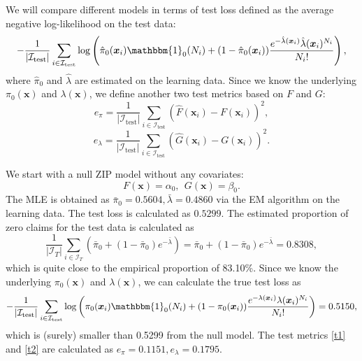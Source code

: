 \documentclass[11pt]{article}
\numberwithin{equation}{section}
\def\bx{\boldsymbol{x}}
\begin{document}
We will compare different models in terms of test loss defined as the average negative log-likelihood on the test data:
\begin{equation}\label{zip-test-loss}
	-\frac{1}{|\mathcal{I}_\text{test}|}\sum_{i\in\mathcal{I}_\text{test}}\log \left(\hat{\pi}_0(\bx_i)\mathbbm{1}_0(N_i) + 
	(1-\hat{\pi}_0(\bx_i))\frac{e^{-\hat{\lambda}(\bx_i)}\hat{\lambda}(\bx_i)^{N_i}}{N_i!}\right),
\end{equation} 
where $\hat{\pi}_0$ and $\hat{\lambda}$ are estimated on the learning data. 
Since we know the underlying $\pi_0(\bx)$ and $\lambda(\bx)$, we define another two test metrics based on $F$ and $G$:
\begin{equation}\label{t1}
	e_\pi=\frac{1}{|\mathcal{I}_\text{test}|}\sum_{i\in\mathcal{I}_\text{test}}(\hat{F}(\bx_i)-F(\bx_i))^2,
\end{equation}
\begin{equation}\label{t2}
	e_\lambda=\frac{1}{|\mathcal{I}_\text{test}|}\sum_{i\in\mathcal{I}_\text{test}}(\hat{G}(\bx_i)-G(\bx_i))^2.
\end{equation}


We start with a null ZIP model without any covariates:
\begin{equation}\label{zip-null}
	F(\bx)=\alpha_0, ~~G(\bx)=\beta_0. 
\end{equation}
The MLE is obtained as $\bar{\pi}_0=0.5604, \bar{\lambda}=0.4860$ via the EM algorithm on the learning data.
The test loss is calculated as $0.5299$. 
The estimated proportion of zero claims for the test data is calculated as 
$$\frac{1}{|\mathcal{I}_T|}\sum_{i\in\mathcal{I}_T}\left(\bar{\pi}_0+(1-\bar{\pi}_0)e^{-\bar{\lambda}}\right)=\bar{\pi}_0+(1-\bar{\pi}_0)e^{-\bar{\lambda}}=0.8308,$$
which is quite close to the empirical proportion of 83.10\%.
Since we know the underlying $\pi_0(\bx)$ and $\lambda(\bx)$, we can calculate the true test loss as 
\begin{equation}
	-\frac{1}{|\mathcal{I}_\text{test}|}\sum_{i\in\mathcal{I}_\text{test}}\log \left({\pi}_0(\bx_i)\mathbbm{1}_0(N_i) + 
	(1-{\pi}_0(\bx_i))\frac{e^{-{\lambda}(\bx_i)}{\lambda}(\bx_i)^{N_i}}{N_i!}\right)=0.5150,
\end{equation}   
which is (surely) smaller than 0.5299 from the null model.
The test metrics \eqref{t1} and \eqref{t2} are calculated as $e_\pi=0.1151, e_\lambda=0.1795$.
\end{document}
